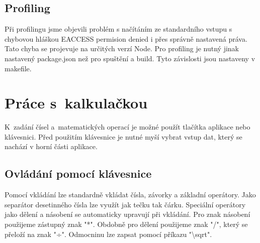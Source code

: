 \documentclass[12pt,czech]{article}
\begin{document}
\subsection{Profiling}
Při profilingu jsme objevili problém s načítáním ze standardního vstupu s chybovou hláškou EACCESS permision denied i přes správně nastavená práva. Tato chyba se projevuje na určitých verzí Node. Pro profiling je nutný jinak nastavený package.json než pro spuštění a build. Tyto závislosti jsou nastaveny v makefile.

\newpage
\section{Práce s~kalkulačkou}
K~zadání čísel a~matematických operací je možné použít tlačítka aplikace nebo klávesnici. Před použitím klávesnice je nutné myší vybrat vstup dat, který se nachází v horní části aplikace. 

\subsection{Ovládání pomocí klávesnice}
Pomocí vkládání lze standardně vkládat čísla, závorky a základní operátory.
Jako separátor desetinného čísla lze využít jak tečku tak čárku. Speciální operátory jako dělení a násobení se automaticky upravují při vkládání. Pro znak násobení použijeme zástupný znak "*". Obdobně pro dělení použijeme znak "/", který se přeloží na znak "÷". Odmocninu lze zapsat pomocí příkazu "\textbackslash sqrt".
\end{document}
